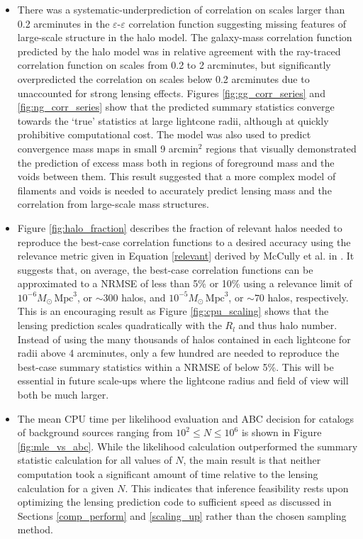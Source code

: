 \documentclass[%
 reprint,
 amsmath,amssymb,
 aps,nofootinbib
]{revtex4-1}
\begin{document}
\begin{itemize}
\item There was a systematic-underprediction of correlation on scales larger than 0.2 arcminutes in the $\varepsilon$-$\varepsilon$ correlation function suggesting missing features of large-scale structure in the halo model. The galaxy-mass correlation function predicted by the halo model was in relative agreement with the ray-traced correlation function on scales from 0.2 to 2 arcminutes, but significantly overpredicted the correlation on scales below 0.2 arcminutes due to unaccounted for strong lensing effects. Figures \ref{fig:gg_corr_series} and \ref{fig:ng_corr_series} show that the predicted summary statistics converge towards the `true' statistics at large lightcone radii, although at quickly prohibitive computational cost. The model was also used to predict convergence mass maps in small 9 arcmin$^2$ regions that visually demonstrated the prediction of excess mass both in regions of foreground mass and the voids between them. This result suggested that a more complex model of filaments and voids is needed to accurately predict lensing mass and the correlation from large-scale mass structures.

\item Figure \ref{fig:halo_fraction} describes the fraction of relevant halos needed to reproduce the best-case correlation functions to a desired accuracy using the relevance metric given in Equation \eqref{relevant} derived by McCully et al. in \cite{mccully}. It suggests that, on average, the best-case correlation functions can be approximated to a NRMSE of less than 5\% or 10\% using a relevance limit of ${10^{-6}M_\odot\,\text{Mpc}^3}$, or $\sim300$ halos, and ${10^{-5}M_\odot\,\text{Mpc}^3}$, or $\sim70$ halos, respectively. This is an encouraging result as Figure \ref{fig:cpu_scaling} shows that the lensing prediction scales quadratically with the $R_l$ and thus halo number. Instead of using the many thousands of halos contained in each lightcone for radii above 4 arcminutes, only a few hundred are needed to reproduce the best-case summary statistics within a NRMSE of below 5\%. This will be essential in future scale-ups where the lightcone radius and field of view will both be much larger.

\item The mean CPU time per likelihood evaluation and ABC decision for catalogs of background sources ranging from $10^2\leq N\leq10^6$ is shown in Figure \ref{fig:mle_vs_abc}. While the likelihood calculation outperformed the summary statistic calculation for all values of $N$, the main result is that neither computation took a significant amount of time relative to the lensing calculation for a given $N$. This indicates that inference feasibility rests upon optimizing the lensing prediction code to sufficient speed as discussed in Sections \ref{comp_perform} and \ref{scaling_up} rather than the chosen sampling method.
\end{itemize}
\end{document}
